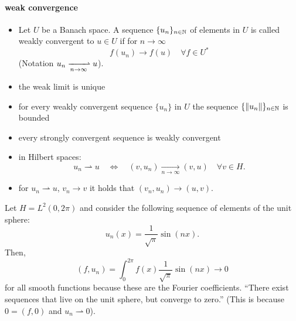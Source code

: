 \documentclass[../skript.tex]{subfiles}
\begin{document}
\paragraph{weak convergence}
\begin{itemize}
\item Let $U$ be a Banach space. A sequence $\{ u_n \}_{n \in \mathbb{N}}$ of elements in $U$ is called weakly convergent to $u \in U$ if for $n \to \infty$
\[
	f(u_n) \to f(u) \quad \forall f \in U^*
\]
(Notation $u_n \xrightharpoonup[n \to \infty]{} u$).
\item the weak limit is unique
\item for every weakly convergent sequence $\{ u_n \}$ in $U$ the sequence $\{ \| u_n \| \}_{n \in \mathbb{N}}$ is bounded
\item every strongly convergent sequence is weakly convergent
\item in Hilbert spaces:
\[
	u_n \rightharpoonup u \quad \iff \quad (v, u_n) \xrightarrow[n \to \infty]{} (v, u) \quad \forall v \in H.
\]
\item for $u_n \rightharpoonup u$, $v_n \to v$ it holds that $(v_n, u_n) \to (u, v)$.
\end{itemize}
\begin{example}
Let $H = L^2(0, 2\pi)$ and consider the following sequence of elements of the unit sphere:
\[
	u_n(x) = \frac{1}{\sqrt{\pi}} \sin(nx).
\]
Then,
\[
	(f, u_n) = \int_0^{2\pi} f(x) \frac{1}{\sqrt{\pi}} \sin(nx) \to 0
\]
for all smooth functions because these are the Fourier coefficients.
``There exist sequences that live on the unit sphere, but converge to zero.''
(This is because $0 = (f, 0)$ and $u_n \rightharpoonup 0$).
\end{example}
\end{document}
